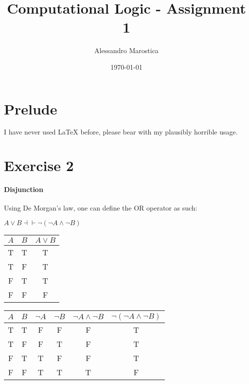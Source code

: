 \documentclass[11pt]{exam}
\title{Computational Logic - Assignment 1}
\author{Alessandro Marostica}
\date{\today}
\begin{document}
\maketitle
\section*{Prelude}
I have never used LaTeX before, please bear with my plausibly horrible usage.
\section*{Exercise 2}
\paragraph*{Disjunction}
Using De Morgan's law, one can define the OR operator as such:
\begin{center}
    \(A \vee B \dashv \vdash \neg(\neg A \wedge \neg B)\)
\end{center}
\begin{center}
    \begin{tabular}{|c|c|c|}
        \hline
        \(A\) & \(B\) & \(A \vee B\) \\
        \hline
        T & T & T \\
        T & F & T \\
        F & T & T \\
        F & F & F \\
        \hline
    \end{tabular}
    \begin{tabular}{|c|c|c|c|c|c|}
        \hline
        \(A\) & \(B\) & \(\neg A\) & \(\neg B\) & \(\neg A \wedge \neg B\) & \(\neg(\neg A \wedge \neg B)\) \\
        \hline
        T & T & F & F & F & T \\
        T & F & F & T & F & T \\
        F & T & T & F & F & T \\
        F & F & T & T & T & F \\
        \hline       
    \end{tabular}
\end{center}
\end{document}
